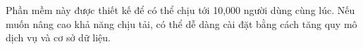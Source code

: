 \documentclass[./../main_file.tex]{subfiles}
\begin{document}
	Phần mềm này được thiết kế để có thể chịu tới 10,000 người dùng cùng lúc. Nếu muốn nâng cao khả năng chịu tải, có thể dễ dàng cài đặt bằng cách tăng quy mô dịch vụ và cơ sở dữ liệu.
\end{document}
